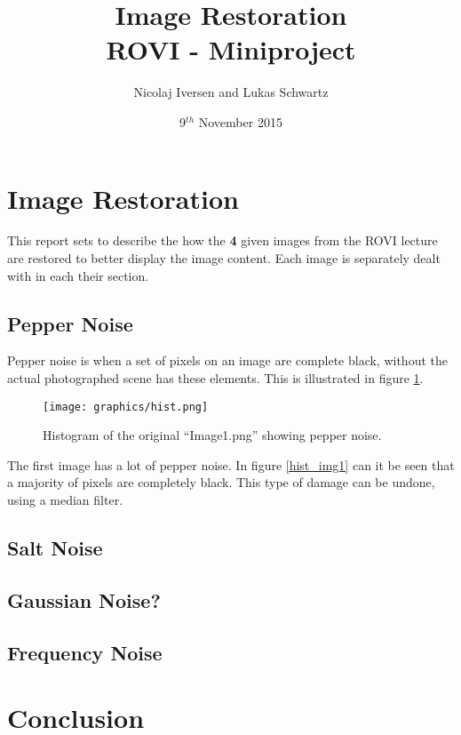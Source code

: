 \documentclass[12pt,a4paper]{article}
\begin{document}
\title{Image Restoration\\ \large{ROVI - Miniproject}}
\author{Nicolaj Iversen and Lukas Schwartz}
\date{9$^{th}$ November 2015}


\maketitle

\pagebreak




\section{Image Restoration}
This report sets to describe the how the \textbf{4} given images from the ROVI lecture are restored to better display the image content.
Each image is separately dealt with in each their section.


\subsection{Pepper Noise}
Pepper noise is when a set of pixels on an image are complete black, without the actual photographed scene has these elements.
This is illustrated in figure \ref{fig:hist_pepper}.

\begin{figure}[H]
\texttt{[image: graphics/hist.png]}
\caption{Histogram of the original ``Image1.png'' showing pepper noise.}
\label{fig:hist_pepper}
\end{figure}



The first image has a lot of pepper noise.
In figure \ref{hist_img1} can it be seen that a majority of pixels are completely black.
This type of damage can be undone, using a median filter.

\subsection{Salt Noise}


\subsection{Gaussian Noise?}


\subsection{Frequency Noise}



\section{Conclusion}
\end{document}
